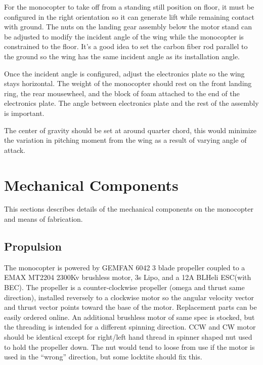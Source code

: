 \documentclass[12pt]{article}
\begin{document}
For the monocopter to take off from a standing still position on floor, it must be configured in the right orientation so it can generate lift while remaining contact with ground. 
The nuts on the landing gear assembly below the motor stand can be adjusted to modify the incident angle of the wing while the monocopter is constrained to the floor. It's a good idea to set the carbon fiber rod parallel to the ground so the wing has the same incident angle as its installation angle.

Once the incident angle is configured, adjust the electronics plate so the wing stays horizontal. The weight of the monocopter should rest on the front landing ring, the rear mousewheel, and the block of foam attached to the end of the electronics plate. The angle between electronics plate and the rest of the assembly is important. 

The center of gravity should be set at around quarter chord, this would minimize the variation in pitching moment from the wing as a result of varying angle of attack.

\section{Mechanical Components}
This sections describes details of the mechanical components on the monocopter and means of fabrication.
\subsection{Propulsion}
The monocopter is powered by GEMFAN 6042 3 blade propeller coupled to a EMAX MT2204 2300Kv brushless motor, 3s Lipo, and a 12A BLHeli ESC(with BEC). The propeller is a counter-clockwise propeller (omega and thrust same direction), installed reversely to a clockwise motor so the angular velocity vector and thrust vector points toward the base of the motor.  Replacement parts can be easily ordered online. An additional brushless motor of same spec is stocked, but the threading is intended for a different spinning direction. CCW and CW motor should be identical except for right/left hand thread in spinner shaped nut used to hold the propeller down. The nut would tend to loose from use if the motor is used in the ``wrong'' direction, but some locktite should fix this. 
\end{document}
